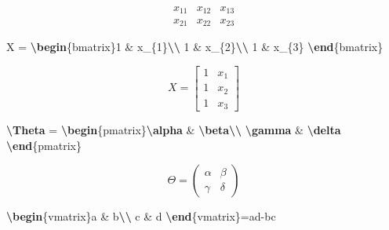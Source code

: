 \documentclass[
  12pt,
]{krantz}
\newenvironment{Shaded}{\begin{snugshade}}{\end{snugshade}}
\newcommand{\ExtensionTok}[1]{#1}
\newcommand{\KeywordTok}[1]{\textcolor[rgb]{0.13,0.29,0.53}{\textbf{#1}}}
\newcommand{\NormalTok}[1]{#1}
\newcommand{\SpecialCharTok}[1]{\textcolor[rgb]{0.81,0.36,0.00}{\textbf{#1}}}
\newcommand{\SpecialStringTok}[1]{\textcolor[rgb]{0.31,0.60,0.02}{#1}}
\theoremstyle{definition}
\theoremstyle{definition}
\theoremstyle{definition}
\theoremstyle{definition}
\theoremstyle{remark}
\begin{document}
\[\begin{array}{ccc}
x_{11} & x_{12} & x_{13}\\
x_{21} & x_{22} & x_{23}
\end{array}\]

\begin{Shaded}
\begin{Highlighting}[]
\SpecialStringTok{$$X = }\KeywordTok{\textbackslash{}begin}\NormalTok{\{}\ExtensionTok{bmatrix}\NormalTok{\}}\SpecialStringTok{1 \& x\_\{1\}}\SpecialCharTok{\textbackslash{}\textbackslash{}}
\SpecialStringTok{1 \& x\_\{2\}}\SpecialCharTok{\textbackslash{}\textbackslash{}}
\SpecialStringTok{1 \& x\_\{3\}}
\KeywordTok{\textbackslash{}end}\NormalTok{\{}\ExtensionTok{bmatrix}\NormalTok{\}}\SpecialStringTok{$$}
\end{Highlighting}
\end{Shaded}

\[X = \begin{bmatrix}1 & x_{1}\\
1 & x_{2}\\
1 & x_{3}
\end{bmatrix}\]

\begin{Shaded}
\begin{Highlighting}[]
\SpecialStringTok{$$}\SpecialCharTok{\textbackslash{}Theta}\SpecialStringTok{ = }\KeywordTok{\textbackslash{}begin}\NormalTok{\{}\ExtensionTok{pmatrix}\NormalTok{\}}\SpecialCharTok{\textbackslash{}alpha}\SpecialStringTok{ \& }\SpecialCharTok{\textbackslash{}beta\textbackslash{}\textbackslash{}}
\SpecialCharTok{\textbackslash{}gamma}\SpecialStringTok{ \& }\SpecialCharTok{\textbackslash{}delta}
\KeywordTok{\textbackslash{}end}\NormalTok{\{}\ExtensionTok{pmatrix}\NormalTok{\}}\SpecialStringTok{$$}
\end{Highlighting}
\end{Shaded}

\[\Theta = \begin{pmatrix}\alpha & \beta\\
\gamma & \delta
\end{pmatrix}\]

\begin{Shaded}
\begin{Highlighting}[]
\SpecialStringTok{$$}\KeywordTok{\textbackslash{}begin}\NormalTok{\{}\ExtensionTok{vmatrix}\NormalTok{\}}\SpecialStringTok{a \& b}\SpecialCharTok{\textbackslash{}\textbackslash{}}
\SpecialStringTok{c \& d}
\KeywordTok{\textbackslash{}end}\NormalTok{\{}\ExtensionTok{vmatrix}\NormalTok{\}}\SpecialStringTok{=ad{-}bc$$}
\end{Highlighting}
\end{Shaded}
\end{document}
